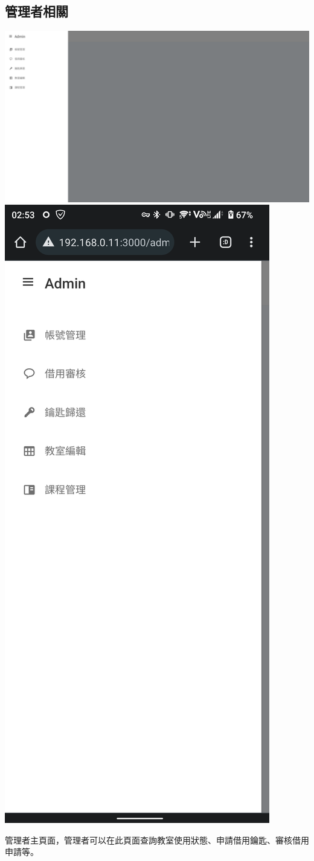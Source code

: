 \documentclass{article}
\begin{document}
\pagebreak

\subsection{管理者相關}


\begin{center}
	\includegraphics[width=0.7\linewidth]{AdminPage.png}
	\includegraphics[width=0.2\linewidth]{AdminPhone.png}
\end{center}

管理者主頁面，管理者可以在此頁面查詢教室使用狀態、申請借用鑰匙、審核借用申請等。

\vfill

\end{document}
